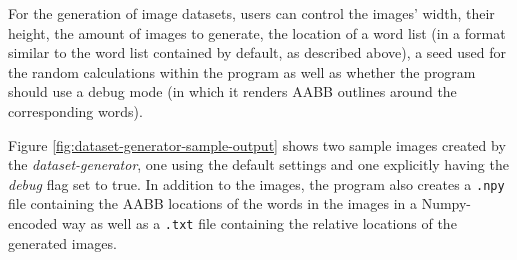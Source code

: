 For the generation of image datasets, users can control the images' width, their height, the amount of images to generate, the location of a word list (in a format similar to the word list contained by default, as described above), a seed used for the random calculations within the program as well as whether the program should use a debug mode (in which it renders AABB outlines around the corresponding words).

Figure \ref{fig:dataset-generator-sample-output} shows two sample images created by the \textit{dataset-generator}, one using the default settings and one explicitly having the \textit{debug} flag set to true. 
In addition to the images, the program also creates a \texttt{.npy} file containing the AABB locations of the words in the images in a Numpy-encoded way as well as a \texttt{.txt} file containing the relative locations of the generated images.

